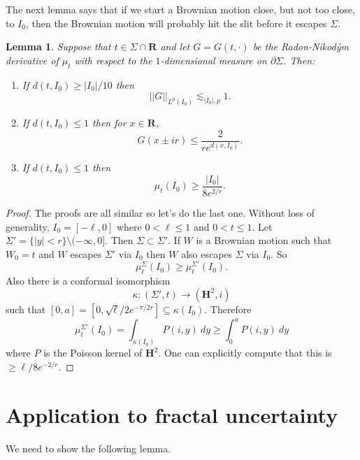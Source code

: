 \documentclass[reqno,12pt,letterpaper]{amsart}
\newcommand{\RR}{\mathbf{R}}
\newcommand{\Hyp}{\mathbf H}
\newtheorem{lemma}[theorem]{Lemma}
\theoremstyle{definition}
\numberwithin{equation}{section}
\begin{document}
The next lemma says that if we start a Brownian motion close, but not too close, to $I_0$, then the Brownian motion will probably hit the slit before it escapes $\Sigma$.

\begin{lemma}
Suppose that $t \in \Sigma \cap \RR$ and let $G = G(t, \cdot)$ be the Radon-Nikod\'ym derivative of $\mu_t$ with respect to the $1$-dimensional measure on $\partial \Sigma$. Then:
\begin{enumerate}
\item If $d(t, I_0) \geq |I_0|/10$ then
$$||G||_{L^p(I_0)} \lesssim_{|I_0|, p} 1.$$
\item If $d(t, I_0) \leq 1$ then for $x \in \RR$,
$$G(x \pm ir) \leq \frac{2}{re^{d(x, I_0)}}.$$
\item If $d(t, I_0) \leq 1$ then
$$\mu_t(I_0) \geq \frac{|I_0|}{8e^{2/r}}.$$
\end{enumerate}
\end{lemma}
\begin{proof}
The proofs are all similar so let's do the last one.
Without loss of generality, $I_0 = [-\ell, 0]$ where $0 < \ell \leq 1$ and $0 < t \leq 1$.
Let $\Sigma' = \{|y| < r\} \setminus (-\infty, 0]$. Then $\Sigma \subset \Sigma'$.
If $W$ is a Brownian motion such that $W_0 = t$ and $W$ escapes $\Sigma'$ via $I_0$ then $W$ also escapes $\Sigma$ via $I_0$.
So
$$\mu_t^\Sigma(I_0) \geq \mu_t^{\Sigma'}(I_0).$$
Also there is a conformal isomorphism
$$\kappa: (\Sigma', t) \to (\Hyp^2, i)$$
such that $[0, a] = [0, \sqrt \ell/2 e^{-\pi/2r}] \subseteq \kappa(I_0)$.
Therefore
$$\mu_t^{\Sigma'}(I_0) = \int_{\kappa(I_0)} P(i, y) ~dy \geq \int_0^a P(i, y) ~dy$$
where $P$ is the Poisson kernel of $\Hyp^2$. One can explicitly compute that this is $\geq \ell/8 e^{-2/r}$.
\end{proof}

\section{Application to fractal uncertainty}
We need to show the following lemma.
\end{document}
